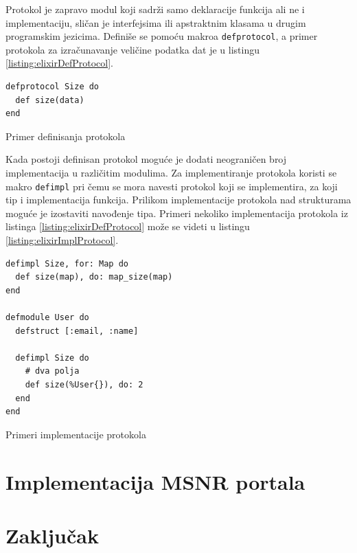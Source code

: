 \documentclass[12pt,oneside]{memoir}
\begin{document}
Protokol je zapravo modul koji sadrži samo deklaracije funkcija ali ne i implementaciju,
sličan je interfejsima ili apstraktnim klasama u drugim programskim jezicima. Definiše se
pomoću makroa \texttt{defprotocol}, a primer protokola za izračunavanje veličine podatka dat
je u listingu \ref{listing:elixirDefProtocol}.
\begin{listing}[!ht]
\begin{verbatim}
defprotocol Size do
  def size(data)
end
\end{verbatim}
\caption{Primer definisanja protokola}
\label{listing:elixirDefProtocol}
\end{listing}
Kada postoji definisan protokol moguće je dodati neograničen broj implementacija u
različitim modulima. Za implementiranje protokola koristi se makro \texttt{defimpl} pri čemu
se mora navesti protokol koji se implementira, za koji tip i implementacija funkcija.
Prilikom implementacije protokola nad strukturama moguće je izostaviti navođenje tipa.
Primeri nekoliko implementacija protokola iz listinga \ref{listing:elixirDefProtocol} može se videti u
listingu \ref{listing:elixirImplProtocol}.
\begin{listing}[!ht]
\begin{verbatim}
defimpl Size, for: Map do
  def size(map), do: map_size(map)
end

defmodule User do
  defstruct [:email, :name]

  defimpl Size do
    # dva polja
    def size(%User{}), do: 2
  end
end
\end{verbatim}
\caption{Primeri implementacije protokola}
\label{listing:elixirImplProtocol}
\end{listing}

\chapter{Implementacija MSNR portala}


\chapter{Zaključak}

\literatura

\end{document}
